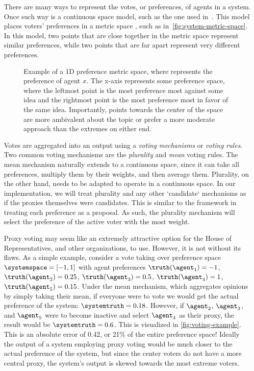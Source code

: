 There are many ways to represent the votes, or preferences, of agents in a system.
Once such way is a continuous space model, such as the one used in~\cite{Cohensius2017}.
This model places voters' preferences in a metric space \systemspace, such as
in~\autoref{fig:system-metric-space}.
In this model, two points that are close together in the metric space represent
similar preferences, while two points that are far apart represent very different
preferences.

\begin{figure}[htbp]
    \centering
    
    \caption{
        Example of a 1D preference metric space, where  represents the
        preference of agent $x$.
        The x-axis represents some preference space, where the leftmost point is
        the most preference most against some idea and the rightmost point is the most
        preference most in favor of the same idea.
        Importantly, points towards the center of the space are more ambivalent about
        the topic or prefer a more moderate approach than the extremes on either end.
    }
    \label{fig:system-metric-space}
\end{figure}

Votes are aggregated into an output using a \textit{voting mechanisms} or
\textit{voting rules}.
Two common voting mechanisms are the \textit{plurality} and \textit{mean} voting rules.
The mean mechanism naturally extends to a continuous space, since it can take all
preferences, multiply them by their weights, and then average them.
Plurality, on the other hand, needs to be adapted to operate in a continuous space.
In our implementation, we will treat plurality and any other `candidate` mechanisms
as if the proxies themselves were candidates.
This is similar to the framework in~\cite{Bulteau2021} treating each preference as a
proposal.
As such, the plurality mechanism will select the preference of the active voter with
the most weight.

Proxy voting may seem like an extremely attractive option for the House of
Representatives, and other organizations, to use.
However, it is not without its flaws.
As a simple example, consider a vote taking over preference
space $\systemspace = [-1, 1]$ with agent preferences $\truthof{\agent_1} = -1$,
$\truthof{\agent_2} = 0.25$, $\truthof{\agent_3} = 0.5$, $\truthof{\agent_4} = 1$,
$\truthof{\agent_5} = 0.15$.
Under the mean mechanism, which aggregates opinions by simply taking their mean, if
everyone were to vote we would get the actual preference of the
system: $\systemtruth = 0.18$.
However, if $\agent_2$, $\agent_3$, and $\agent_5$ were to become inactive and select
$\agent_4$ as their proxy, the result would be $\systemtruth = 0.6$.
This is visualized in \autoref{fig:voting-example}.
This is an absolute error of 0.42, or 21\% of the entire preference space!
Ideally the output of a system employing proxy voting would be much closer to the
actual preference of the system, but since the center voters do not have a more
central proxy, the system's output is skewed towards the most extreme voters.

